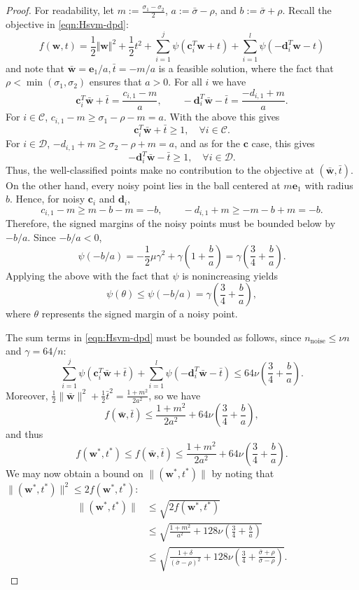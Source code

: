 \documentclass[twoside,11pt]{article}
\renewcommand{\c}{\bm{c}}
\renewcommand{\d}{\bm{d}}
\newcommand\w{\bm{w}}
\newcommand\e{\bm{e}}
\newcommand\CC{\mathcal{C}}
\newcommand\DD{\mathcal{D}}
\begin{document}
\begin{proof}
  For readability, let $m := \frac{\sigma_1 - \sigma_2}{2}$, $a := \bar{\sigma} - \rho$, and $b := \bar{\sigma} + \rho$. 
  Recall the objective in \eqref{eqn:Hsvm-dpd}:
  \[
    f(\w,t) = \frac{1}{2}\Vert\w\Vert^2 + \frac{1}{2}t^2 + \sum_{i=1}^j\psi(\c_i^T\w+t)+\sum_{i=1}^l\psi(-\d_i^T\w-t)
  \]
  and note that $\bar{\w} = \e_1/a, \bar{t} = -m/a$ is a feasible solution, where the fact that $\rho < \min(\sigma_1,\sigma_2)$ ensures that $a > 0$.
  For all $i$ we have
  \[
    \c_i^T\bar{\w} + \bar{t} = \frac{c_{i,1} - m}{a},\qquad -\d_i^T\bar{\w} - \bar{t} = \frac{-d_{i,1} + m}{a}.
  \]
  For $i \in \CC$, $c_{i,1} - m \geq \sigma_1 - \rho - m = a$. With the above this gives
  \[
    \c_i^T\bar{\w} + \bar{t} \geq 1,\quad \forall i \in \CC.
  \]
  For $i \in \DD$, $-d_{i,1} + m \geq \sigma_2 - \rho + m = a$, and as for the $\c$ case, this gives
  \[
    -\d_i^T\bar{\w} - \bar{t} \geq 1,\quad \forall i \in \DD.
  \]
  Thus, the well-classified points make no contribution to the objective at $(\bar{\w},\bar{t})$. On the other hand, every noisy point lies in the ball centered at $m\e_1$ with radius $b$. Hence, for noisy $\c_i$ and $\d_i$,
  \[
    c_{i,1} - m \geq m - b - m = -b,\qquad -d_{i,1} + m \geq -m - b + m = -b.
  \]
  Therefore, the signed margins of the noisy points must be bounded below by $-b/a$. Since $-b/a < 0$,
  \[
    \psi(-b/a) = -\frac{1}{2}\mu\gamma^2 + \gamma\left(1 + \frac{b}{a}\right) = \gamma\left(\frac{3}{4} + \frac{b}{a}\right).
  \]
  Applying the above with the fact that $\psi$ is nonincreasing yields
  \[
      \psi(\theta) \leq \psi(-b/a) = \gamma\left(\frac{3}{4} + \frac{b}{a}\right),
  \]
  where $\theta$ represents the signed margin of a noisy point.
  
  The sum terms
  in \eqref{eqn:Hsvm-dpd} must be bounded as follows, since $n_{\text{noise}} \leq \nu n$ and $\gamma = 64/n$:
  \[
    \sum_{i=1}^j\psi(\c_i^T\bar{\w}+\bar{t})+\sum_{i=1}^l\psi(-\d_i^T\bar{\w}-\bar{t}) \leq 64\nu\left(\frac{3}{4} + \frac{b}{a}\right).
  \]
  Moreover, $\frac{1}{2}\lVert\bar{\w}\rVert^2 + \frac{1}{2}\bar{t}^2 = \frac{1+m^2}{2a^2}$, so we have
  \[
    f(\bar{\w},\bar{t}) \leq \frac{1+m^2}{2a^2} + 64\nu\left(\frac{3}{4} + \frac{b}{a}\right),
  \]
  and thus
  \[
    f(\w^*,t^*) \leq f(\bar{\w},\bar{t}) \leq \frac{1+m^2}{2a^2} + 64\nu\left(\frac{3}{4} + \frac{b}{a}\right).
  \]
  We may now obtain a bound on $\lVert(\w^*,t^*)\rVert$ by noting that $\lVert(\w^*,t^*)\rVert^2 \leq 2f(\w^*,t^*)$:
  \begin{align*}
    \lVert(\w^*,t^*)\rVert &\leq \sqrt{2f(\w^*,t^*)}\\
                           &\leq \sqrt{\frac{1+m^2}{a^2} + 128\nu\left(\frac{3}{4} + \frac{b}{a}\right)}\\
                           &\leq \sqrt{\frac{1 + \delta}{(\bar{\sigma} - \rho)^2} + 128\nu\left(\frac{3}{4} + \frac{\bar{\sigma} + \rho}{\bar{\sigma} - \rho}\right)}.
  \end{align*}
\end{proof}
\end{document}
